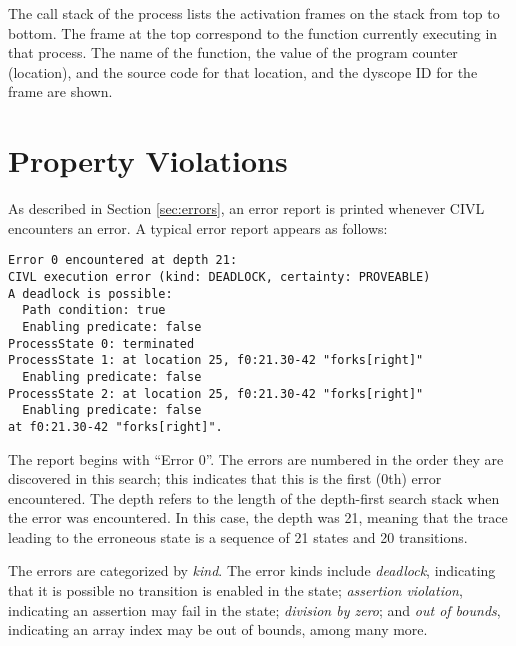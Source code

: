 The call stack of the process lists the activation frames on the stack
from top to bottom.  The frame at the top correspond to the function
currently executing in that process.  The name of the function, the
value of the program counter (location), and the source code for that
location, and the dyscope ID for the frame are shown.

\section{Property Violations}

As described in Section \ref{sec:errors}, an error report is printed
whenever CIVL encounters an error. A typical error report appears as
follows:
\begin{small}
\begin{verbatim}
Error 0 encountered at depth 21:
CIVL execution error (kind: DEADLOCK, certainty: PROVEABLE)
A deadlock is possible:
  Path condition: true
  Enabling predicate: false
ProcessState 0: terminated
ProcessState 1: at location 25, f0:21.30-42 "forks[right]"
  Enabling predicate: false
ProcessState 2: at location 25, f0:21.30-42 "forks[right]"
  Enabling predicate: false
at f0:21.30-42 "forks[right]".
\end{verbatim}
\end{small}

The report begins with ``Error 0''.  The errors are numbered in the
order they are discovered in this search; this indicates that this is
the first (0th) error encountered.  The depth refers to the length of
the depth-first search stack when the error was encountered.  In this
case, the depth was 21, meaning that the trace leading to the
erroneous state is a sequence of 21 states and 20 transitions.

The errors are categorized by \emph{kind}.  The error kinds include
\emph{deadlock}, indicating that it is possible no transition is
enabled in the state; \emph{assertion violation}, indicating an
assertion may fail in the state; \emph{division by zero}; and
\emph{out of bounds}, indicating an array index may be out of bounds,
among many more.

